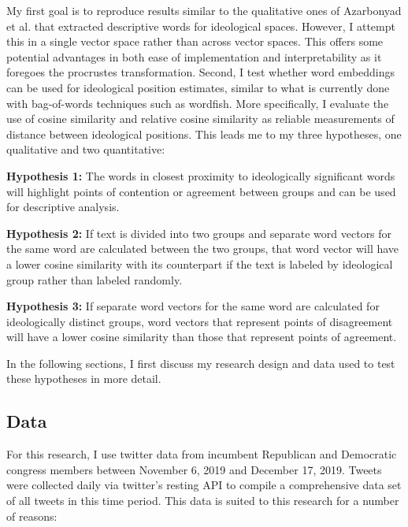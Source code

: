 \documentclass[../embeddings.tex]{subfiles}
\begin{document}
My first goal is to reproduce results similar to the qualitative ones of Azarbonyad et al. that extracted descriptive words for ideological spaces. However, I attempt this in a single vector space rather than across vector spaces. This offers some potential advantages in both ease of implementation and interpretability as it foregoes the procrustes transformation. Second, I test whether word embeddings can be used for ideological position estimates, similar to what is currently done with bag-of-words techniques such as wordfish. More specifically, I evaluate the use of cosine similarity and relative cosine similarity as reliable measurements of distance between ideological positions. This leads me to my three hypotheses, one qualitative and two quantitative:

\hangindent=2.2cm \textbf{Hypothesis 1:} The words in closest proximity to ideologically significant words will highlight points of contention or agreement between groups and can be used for descriptive analysis.

\hangindent=2.2cm \textbf{Hypothesis 2:} If text is divided into two groups and separate word vectors for the same word are calculated between the two groups, that word vector will have a lower cosine similarity with its counterpart if the text is labeled by ideological group rather than labeled randomly.

\hangindent=2.2cm \textbf{Hypothesis 3:} If separate word vectors for the same word are calculated for ideologically distinct groups, word vectors that represent points of disagreement will have a lower cosine similarity than those that represent points of agreement.

In the following sections, I first discuss my research design and data used to test these hypotheses in more detail.

\subsection{Data}
For this research, I use twitter data from incumbent Republican and Democratic congress members between November 6, 2019 and December 17, 2019. Tweets were collected daily via twitter’s resting API to compile a comprehensive data set of all tweets in this time period. This data is suited to this research for a number of reasons:
\end{document}
